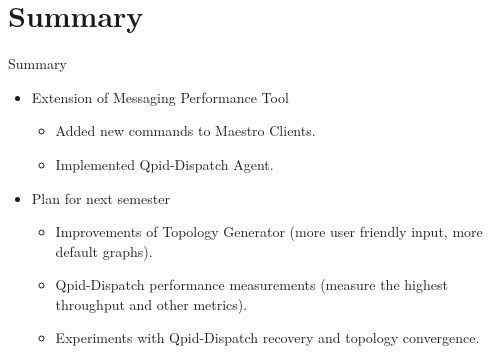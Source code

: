 \documentclass[hyperref={pdfpagelabels=false, unicode},pdf,slideColor,fyma,9pt]{beamer}
\begin{document}
		\section{Summary}
		\begin{frame}{Summary}
				\begin{itemize}
						\setlength\itemsep{0.5em}
						\item Extension of Messaging Performance Tool
						\vspace{0.5em}
						\begin{itemize}
							\setlength\itemsep{0.5em}
							\item Added new commands to Maestro Clients.
							\item Implemented Qpid-Dispatch Agent.
						\end{itemize}
						\vspace{1em}
						\item Plan for next semester
						\vspace{0.5em}
						\begin{itemize}
							\setlength\itemsep{0.5em}
							\item Improvements of Topology Generator (more user friendly input, more default graphs).
							\item Qpid-Dispatch performance measurements (measure the highest throughput and other metrics).
							\item Experiments with Qpid-Dispatch recovery and topology convergence. 
						\end{itemize}
				\end{itemize}
		\end{frame}
\end{document}
